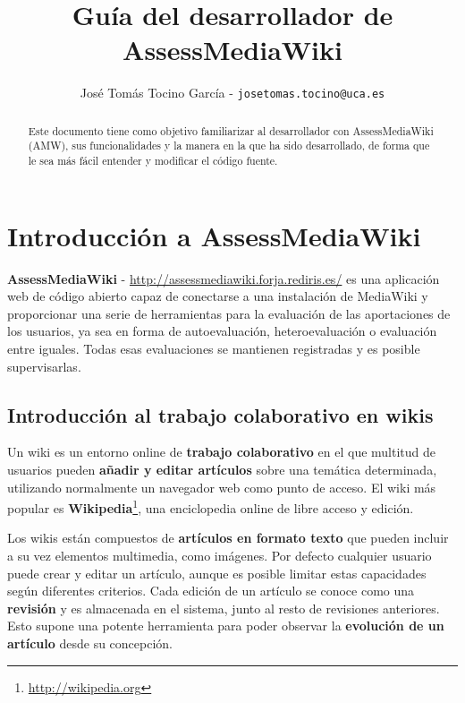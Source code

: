 \documentclass[11pt]{article}
\title{Guía del desarrollador de AssessMediaWiki}
\author{José Tomás Tocino García - \texttt{josetomas.tocino@uca.es}}
\date{}
\begin{document}
\begin{titlepage}
\maketitle  

\begin{abstract}
  Este documento tiene como objetivo familiarizar al desarrollador con
  AssessMediaWiki (AMW), sus funcionalidades y la manera en la que ha sido
  desarrollado, de forma que le sea más fácil entender y modificar el código
  fuente. 
\end{abstract}

\end{titlepage}

\section{Introducción a AssessMediaWiki}

\textbf{AssessMediaWiki} - \url{http://assessmediawiki.forja.rediris.es/} es una
aplicación web de código abierto capaz de conectarse a una instalación de
MediaWiki y proporcionar una serie de herramientas para la evaluación de las
aportaciones de los usuarios, ya sea en forma de autoevaluación,
heteroevaluación o evaluación entre iguales. Todas esas evaluaciones se
mantienen registradas y es posible supervisarlas.

\subsection{Introducción al trabajo colaborativo en wikis}

Un wiki es un entorno online de \textbf{trabajo colaborativo} en el que multitud
de usuarios pueden \textbf{añadir y editar artículos} sobre una temática
determinada, utilizando normalmente un navegador web como punto de acceso. El
wiki más popular es\textbf{ Wikipedia}\footnote{\url{http://wikipedia.org}}, una
enciclopedia online de libre acceso y edición.

Los wikis están compuestos de \textbf{artículos en formato texto} que pueden
incluir a su vez elementos multimedia, como imágenes. Por defecto cualquier
usuario puede crear y editar un artículo, aunque es posible limitar estas
capacidades según diferentes criterios. Cada edición de un artículo se conoce
como una \textbf{revisión} y es almacenada en el sistema, junto al resto de
revisiones anteriores. Esto supone una potente herramienta para poder observar
la \textbf{evolución de un artículo} desde su concepción.
\end{document}
